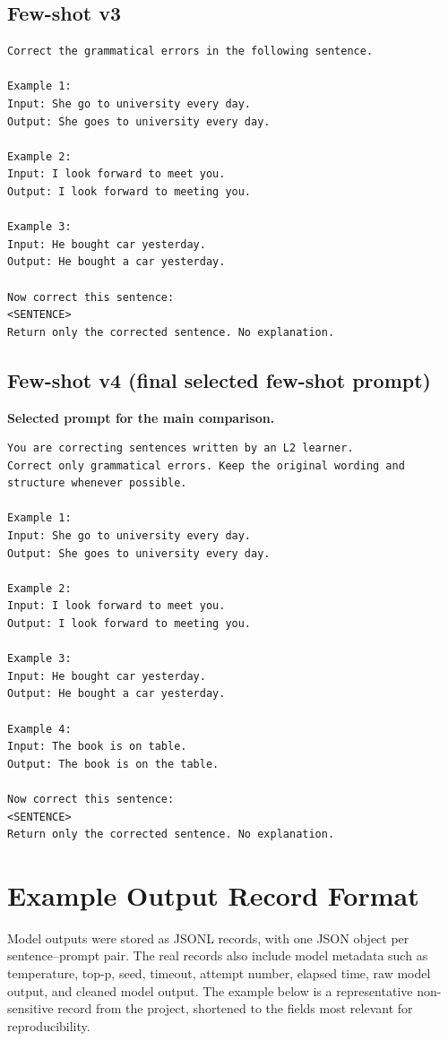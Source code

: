 \subsection{Few-shot v3}
\begin{verbatim}
Correct the grammatical errors in the following sentence.

Example 1:
Input: She go to university every day.
Output: She goes to university every day.

Example 2:
Input: I look forward to meet you.
Output: I look forward to meeting you.

Example 3:
Input: He bought car yesterday.
Output: He bought a car yesterday.

Now correct this sentence:
<SENTENCE>
Return only the corrected sentence. No explanation.
\end{verbatim}

\subsection{Few-shot v4 (final selected few-shot prompt)}
\textbf{Selected prompt for the main comparison.}

\begin{verbatim}
You are correcting sentences written by an L2 learner.
Correct only grammatical errors. Keep the original wording and structure whenever possible.

Example 1:
Input: She go to university every day.
Output: She goes to university every day.

Example 2:
Input: I look forward to meet you.
Output: I look forward to meeting you.

Example 3:
Input: He bought car yesterday.
Output: He bought a car yesterday.

Example 4:
Input: The book is on table.
Output: The book is on the table.

Now correct this sentence:
<SENTENCE>
Return only the corrected sentence. No explanation.
\end{verbatim}

\section{Example Output Record Format}
\label{app:output-record-format}

Model outputs were stored as JSONL records, with one JSON object per sentence--prompt pair. The real records also include model metadata such as temperature, top-p, seed, timeout, attempt number, elapsed time, raw model output, and cleaned model output. The example below is a representative non-sensitive record from the project, shortened to the fields most relevant for reproducibility.

